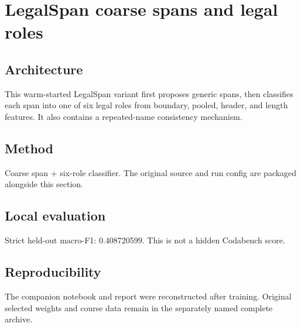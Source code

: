 \section{LegalSpan coarse spans and legal roles}
\subsection{Architecture}
This warm-started LegalSpan variant first proposes generic spans, then classifies each span into one of six legal roles from boundary, pooled, header, and length features. It also contains a repeated-name consistency mechanism.
\subsection{Method}
Coarse span + six-role classifier. The original source and run config are packaged alongside this section.
\subsection{Local evaluation}
Strict held-out macro-F1: 0.408720599. This is not a hidden Codabench score.
\subsection{Reproducibility}
The companion notebook and report were reconstructed after training. Original selected weights and course data remain in the separately named complete archive.
